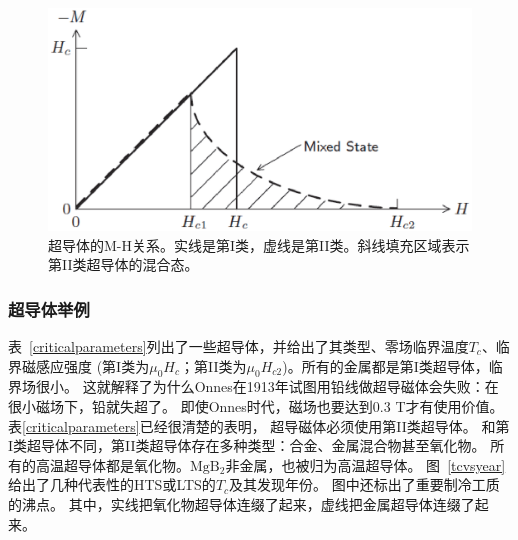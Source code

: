 \begin{figure}[htbp]
  \centering
 \includegraphics[scale=0.6]{chpt1/figs/fig1.3.eps}
  \caption{
超导体的M-H关系。实线是第I类，虚线是第II类。斜线填充区域表示第II类超导体的混合态。
}\label{mhcurve}
\end{figure}

\subsubsection{超导体举例}
表~\ref{criticalparameters}列出了一些超导体，并给出了其类型、零场临界温度$T_c$、临界磁感应强度
(第I类为$\mu_0H_c$；第II类为$\mu_0H_{c2}$)。所有的金属都是第I类超导体，临界场很小。
这就解释了为什么Onnes在1913年试图用铅线做超导磁体会失败：在很小磁场下，铅就失超了。
即使Onnes时代，磁场也要达到0.3 T才有使用价值。表\ref{criticalparameters}已经很清楚的表明，
超导磁体必须使用第II类超导体。
和第I类超导体不同，第II类超导体存在多种类型：合金、金属混合物甚至氧化物。
所有的高温超导体都是氧化物。$\mathrm{MgB_2}$非金属，也被归为高温超导体。
图~\ref{tcvsyear}给出了几种代表性的HTS或LTS的$T_c$及其发现年份。
图中还标出了重要制冷工质的沸点。
其中，实线把氧化物超导体连缀了起来，虚线把金属超导体连缀了起来。

